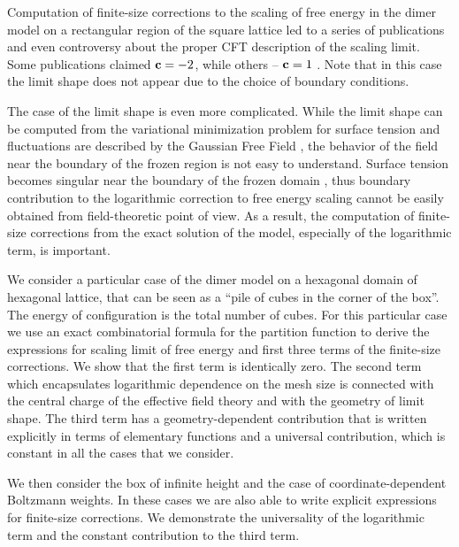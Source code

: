 \documentclass{article}
\begin{document}
Computation of finite-size corrections to the scaling of free energy
in the dimer model on a rectangular region of the square lattice led
to a series of publications and even controversy about the proper CFT
description of the scaling limit. Some publications claimed
${\bf c}=-2$\cite{Rasmussen_2012}, while others -- ${\bf c}=1$
\cite{allegra2015exact,morin2016integrability,Sh_Izmailian_2019,izmailian2016finite,izmailian2005logarithmic}.
Note that in this case the limit shape does not appear due to the
choice of boundary conditions.

The case of the limit shape is even more complicated. While the limit
shape can be computed from the variational minimization problem for
surface tension \cite{kenyon2007limit,kenyon2006dimers} and
fluctuations are described by the Gaussian Free Field
\cite{kenyon2001dominos,kenyon2008height,kenyon2009lectures}, the
behavior of the field near the boundary of the frozen region is not
easy to understand. Surface tension becomes singular near the boundary
of the frozen domain \cite{kenyon2007limit}, thus boundary
contribution to the logarithmic correction to free energy scaling
cannot be easily obtained from field-theoretic point of view. As a
result, the computation of finite-size corrections from the exact
solution of the model, especially of the logarithmic term, is
important.

We consider a particular case of the dimer model on a hexagonal domain
of hexagonal lattice, that can be seen as a ``pile of cubes in the
corner of the box''. The energy of configuration is the total number
of cubes. For this particular case we use an exact combinatorial
formula for the partition function to derive the expressions for
scaling limit of free energy and first three terms of the finite-size
corrections. We show that the first term is identically zero. The
second term which encapsulates logarithmic dependence on the mesh size
is connected with the central charge of the effective field theory and
with the geometry of limit shape. The third term has a
geometry-dependent contribution that is written explicitly in terms of
elementary functions and a universal contribution, which is constant
in all the cases that we consider.

We then consider the box of infinite height and the case of
coordinate-dependent Boltzmann weights. In these cases we are also
able to write explicit expressions for finite-size corrections. We
demonstrate the universality of the logarithmic term and the constant
contribution to the third term.
\end{document}
